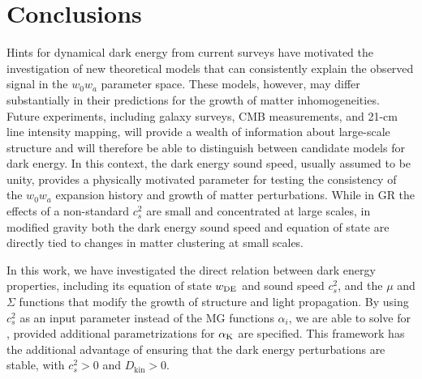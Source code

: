 \documentclass[%
reprint,
superscriptaddress,
preprint numbers,
nofootinbib,
amsmath,amssymb,
aps,
prd
]{revtex4-2}
\begin{document}
\section{Conclusions}
\label{sec:conclusions}
Hints for dynamical dark energy from current surveys have motivated the investigation of new theoretical models that can consistently explain the observed signal in the $w_0w_a$ parameter space. These models, however, may differ substantially in their predictions for the growth of matter inhomogeneities. Future experiments, including galaxy surveys, CMB measurements, and 21-cm line intensity mapping, will provide a wealth of information about large-scale structure and will therefore be able to distinguish between candidate models for dark energy. In this context, the dark energy sound speed, usually assumed to be unity, provides a physically motivated parameter for testing the consistency of the $w_0w_a$ expansion history and growth of matter perturbations. While in GR the effects of a non-standard $c_s^2$ are small and concentrated at large scales, in modified gravity both the dark energy sound speed and equation of state are directly tied to changes in matter clustering at small scales.

In this work, we have investigated the direct relation between dark energy properties, including its equation of state $w_{\rm DE}$ and sound speed $c_s^2$, and the $\mu$ and $\Sigma$ functions that modify the growth of structure and light propagation. By using $c_s^2$ as an input parameter instead of the MG functions $\alpha_i$, we are able to solve for , provided additional parametrizations for $\alpha_{\rm K}$ are specified.  This framework has the additional advantage of ensuring that the dark energy perturbations are stable, with $c_s^2 > 0$ and $D_\mathrm{kin} > 0$. 
\end{document}
